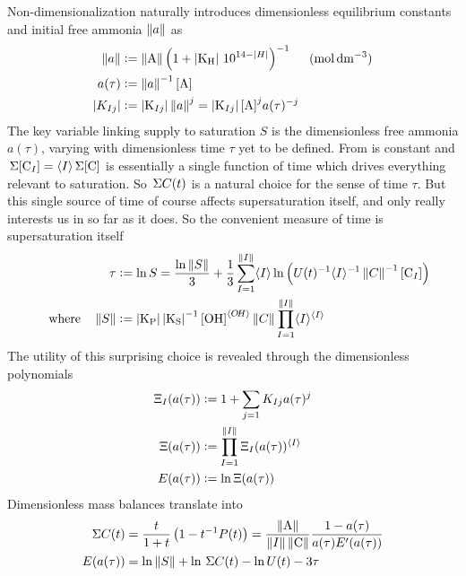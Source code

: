 \documentclass[a4paper]{base}
\newcommand{\stc}[1]{\M{\langle #1 \rangle}}
\begin{document}
    Non-dimensionalization naturally introduces dimensionless equilibrium constants  and initial free ammonia $\left\lVert{a}\right\rVert$ as
    \begin{equation}\label{def:Sat:free}
        \begin{aligned}
            \norm{a} &\deq \norm{\dn{A}} \left(1 + \mds{\dn{K_H}} \, 10^{14 - \mds{H}}\right)^{-1} &\un{mol\, dm^{-3}} \\
            a(\tau) &\deq \norm{a}^{-1} \cn{A} \\
            \mds{K_{Ij}} &\deq \mds{\dn[Ij]{K}} \norm{a}^{j} = \mds{\dn[Ij]{K}} \cn{A}^{j} a(\tau)^{-j} \\
        \end{aligned}
    \end{equation}
    The key variable linking supply to saturation $S$ is the dimensionless free ammonia $a(\tau)$, varying with dimensionless time $\tau$ yet to be defined.
    From   is constant and $\tot{\cn[I]{C}} = \stc{I}\tot{\cn{C}}$ is essentially a single function of time which drives everything relevant to saturation. So $\,\Sigma{C}(t)$ is a natural choice for the sense of time $\tau$. But this single source of time of course affects supersaturation itself, and only really interests us in so far as it does. So the convenient measure of time is supersaturation itself
    \begin{equation}\label{def:Sat:tau}
        \begin{aligned}
            \tau &\deq \ln S = \frac{\ln \norm{S}}{3} + \frac{1}{3}\sum_{I=1}^{\norm{I}} \stc{I} \ln \left(U(t)^{-1}\stc{I}^{-1}\norm{{C}}^{-1}\cn[I]{C}\right) \\
            \QT{where} \norm{S} &\deq \mds{\dn{K_{P}}}\mds{\dn{K_{S}}}^{-1} \cn{OH}^{\stc{O\!H}} \norm{{C}} \prod_{I=1}^{\norm{I}}\stc{I}^{\stc{I}}
        \end{aligned}
    \end{equation}
    The utility of this surprising choice is revealed through the dimensionless polynomials
    \begin{equation}\label{def:Sat:Xi}
        \begin{aligned}
            \Xi_{I}(a(\tau)) &\deq 1 + \sum_{j=1} K_{Ij} a(\tau)^{j} \\
            \Xi(a(\tau)) &\deq \prod_{I=1}^{\norm{I}} \Xi_{I}(a(\tau))^{\stc{I}} \\
            E(a(\tau)) &\deq \ln \Xi(a(\tau))
        \end{aligned}
    \end{equation}
    Dimensionless mass balances translate  into
    \begin{subequations}\label{eq:Sat:MB}
        \begin{align}
            \tot{C(t)} &= \frac{t}{1+t} \left(1-t^{-1}P(t)\right) 
                = \frac{\dn{\norm{A}}}{\norm{I}\dn{\norm{C}}} \frac{1-a(\tau)}{a(\tau)E^{\prime}(a(\tau))} \label{eq:Sat:MBa} \\
            E(a(\tau)) &= \ln \norm{S} + \ln \tot{C}(t) - \ln U(t) - 3\tau \label{eq:Sat:MBb}
        \end{align}
    \end{subequations}
\end{document}
